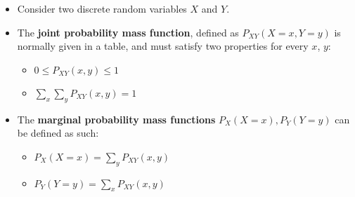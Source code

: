 \documentclass[12pt]{article}
\begin{document}
\begin{itemize}
	\item Consider two discrete random variables $X$ and $Y$.
	\item The \textbf{joint probability mass function}, defined as $P_{XY}(X=x,
		      Y=y)$ is normally given in a table, and must satisfy two properties for
	      every $x$, $y$:
	      \begin{itemize}
		      \item $0 \leq P_{XY}(x, y) \leq 1$
		      \item $\displaystyle\sum_{x} \displaystyle\sum_{y} P_{XY}(x, y) = 1$
	      \end{itemize}
	\item The \textbf{marginal probability mass functions} $P_X(X=x), P_Y(Y=y)$ can be defined as such:
	      \begin{itemize}
		      \item $P_X(X=x) = \displaystyle\sum_{y} P_{XY}(x, y)$
		      \item $P_Y(Y=y) = \displaystyle\sum_{x} P_{XY}(x, y)$
	      \end{itemize}


\end{itemize}
\end{document}
